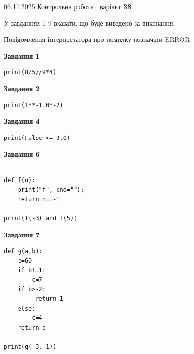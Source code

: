 \documentclass[12pt, ukrainian]{article}
\begin{document}
{\Large{06.11.2025 Контрольна робота , варіант  \No \textbf { 38 }\par}}
{
\begin {large}
У завданнях 1-9 вказати, що буде виведено за виконання.

Повідомлення інтерпретатора про помилку позначати ERROR

\begin{minipage}[t]{7.5cm}

\begin{center}
\textbf{Завдання 1}
\end{center}

\begin{verbatim}
print(8/5//9*4)
\end{verbatim}



\begin{center}
\textbf{Завдання 2}
\end{center}

\begin{verbatim}
print(1**-1.0*-2)
\end{verbatim}



\begin{center}
\textbf{Завдання 4}
\end{center}

\begin{verbatim}
print(False >= 3.0)
\end{verbatim}



\begin{center}
\textbf{Завдання 6}
\end{center}

\begin{verbatim}

def f(n):
    print("f", end="");
    return n==-1

print(f(-3) and f(5))
\end{verbatim}



\begin{center}
\textbf{Завдання 7}
\end{center}

\begin{verbatim}
def g(a,b):
    c=60
    if b!=1:
        c=7
    if b>-2:
         return 1
    else: 
        c=4
    return c

print(g(-3,-1))
\end{verbatim}


\end{minipage}
\end{large}}
\end{document}
